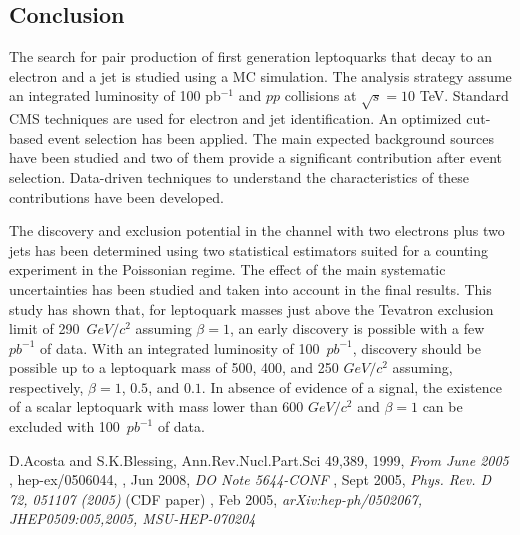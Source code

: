 \documentclass{cmspaper}
\begin{document}
\begin{linenumbers}
\section{Conclusion}

The search for pair production of first generation leptoquarks that decay to
an electron and a jet is studied using a MC simulation.
The analysis strategy 
assume an integrated luminosity of 100 pb$^{-1}$ and $pp$ collisions 
at $\sqrt{s}=10$ TeV.
Standard CMS techniques are used for electron and jet identification. 
An optimized cut-based event selection has been applied.
The main expected background sources have been studied and two of them provide 
a significant contribution after event selection. 
Data-driven techniques to understand the characteristics of these contributions have been developed.

The discovery and exclusion potential in the channel with two electrons plus two jets has 
been determined using two statistical estimators suited for a counting experiment in the Poissonian regime.
The effect of the main systematic uncertainties 
has been studied and taken into account in the final 
results. This study has shown that, 
for leptoquark masses just above the Tevatron exclusion limit of 290~$GeV/c^2$
 assuming $\beta=1$, 
an early discovery is possible with a few $pb^{-1}$ of data.
With an integrated luminosity of 100~$pb^{-1}$, discovery should be possible up
to a leptoquark mass of 500, 400, and 250 $GeV/c^2$ assuming, respectively, 
$\beta=1$, $0.5$, and $0.1$. 
In absence of evidence of a signal, the existence of a scalar leptoquark 
with mass lower than 600 $GeV/c^2$ 
and $\beta=1$ can be excluded with 100~$pb^{-1}$ of data.



\begin{thebibliography}{}

 {D.Acosta and S.K.Blessing, Ann.Rev.Nucl.Part.Sci 49,389},
  1999,
  {\em From June 2005}
, hep-ex/0506044,
, Jun 2008,
  {\em DO Note 5644-CONF}
, Sept 2005,
  {\em Phys. Rev. D 72, 051107 (2005)} (CDF paper)
, Feb 2005,
  {\em arXiv:hep-ph/0502067, JHEP0509:005,2005, MSU-HEP-070204}
  

\end{thebibliography}
\end{linenumbers}
\end{document}
